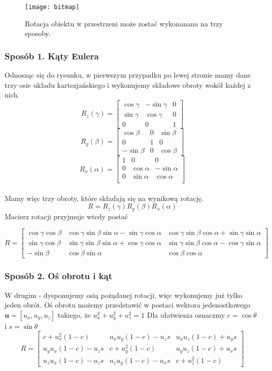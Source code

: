 \documentclass[12pt]{article}
\begin{document}
\begin{figure}[h]
\centering
\texttt{[image: bitmap]}
\caption{Rotacja obiektu w przestrzeni może zostać wykonanana na trzy sposoby.}
\end{figure}

\newpage
\subsubsection{Sposób 1. Kąty Eulera}
Odnosząc się do rysunku, w pierwszym przypadku po lewej stronie mamy dane trzy osie układu kartezjańskiego i wykonujemy składowe obroty wokół każdej z nich. 
\[
R_{z}(\gamma) = \begin{bmatrix}
\cos \gamma & -\sin \gamma & 0 \\
\sin \gamma & \cos \gamma & 0 \\
0 & 0 & 1
\end{bmatrix}
\]
\[
R_{y}(\beta) = \begin{bmatrix}
\cos \beta & 0 & \sin \beta \\
0 & 1 & 0 \\
-\sin \beta & 0 & \cos \beta
\end{bmatrix}
\]
\[
R_{x}(\alpha) = \begin{bmatrix}
1 & 0 & 0 \\
0 & \cos \alpha & -\sin \alpha \\
0 & \sin \alpha & \cos \alpha \\
\end{bmatrix}
\]
\\
Mamy więc trzy obroty, które składają się na wynikową rotację.
\\
\[R = R_{z}(\gamma)R_{y}(\beta)R_{x}(\alpha)\]
Macierz rotacji przyjmuje wtedy postać

\[
R = \begin{bmatrix}
\cos \gamma \cos \beta & 
\cos \gamma \sin \beta \sin \alpha - \sin \gamma \cos \alpha &
\cos \gamma \sin \beta \cos \alpha + \sin \gamma \sin \alpha \\
\sin \gamma \cos \beta &
\sin \gamma \sin \beta \sin \alpha + \cos \gamma \cos \alpha &
\sin \gamma \sin \beta \cos \alpha - \cos \gamma \sin \alpha \\
-\sin \beta & \cos \beta \sin \alpha & \cos \beta \cos \alpha
\end{bmatrix}
\]

\subsubsection{Sposób 2. Oś obrotu i kąt}
W drugim - dysponujemy osią pożądanej rotacji, więc wykonujemy już tylko jeden obrót. Oś obrotu możemy przedstawić w postaci wektora jedenostkowego $\textbf{u} = [u_{x}, u_{y}, u_{z}]$ takiego, że $u_{x}^2+u_{y}^2+u_{z}^2 = 1$ 
Dla ułatwienia oznaczmy $c = \cos \theta$ i $s = \sin \theta$
\[
R = \begin{bmatrix}
c+u_{x}^2(1-c) & u_{x}u_{y}(1-c)-u_{z}s & u_{x}u_{z}(1-c)+u_{y}s \\
u_{y}u_{x}(1-c)-u_{z}s & c+u_{y}^2(1-c) & u_{y}u_{z}(1-c)+u_{x}s \\
u_{z}u_{x}(1-c)-u_{z}s & u_{z}u_{y}(1-c)-u_{x}s & c+u_{z}^2(1-c)
\end{bmatrix}
\]
\end{document}
